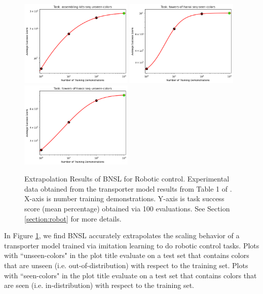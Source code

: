 \documentclass{article} %
\begin{document}
\begin{figure}[htbp]
    \centering
\includegraphics[width=0.48\textwidth]{figures/robot/assembling-kits-seq_unseen-colors.png}
\includegraphics[width=0.48\textwidth]{figures/robot/towers-of-hanoi_seq-seen-colors.png}
\includegraphics[width=0.48\textwidth]{figures/robot/towers-of-hanoi_seq-unseen-colors.png}
    \caption{
Extrapolation Results of BNSL for Robotic control. Experimental data obtained from the transporter \citep{zeng2021transporter} model results from Table 1 of \cite{shridhar2021cliport}. X-axis is number training demonstrations. Y-axis is task success score (mean percentage) obtained via 100 evaluations. See Section \ref{section:robot} for more details.
    }
    \label{fig:robot}
\end{figure}

In Figure \ref{fig:robot}, we find BNSL accurately extrapolates the scaling behavior of a transporter \citep{zeng2021transporter} model trained via imitation learning to do robotic control tasks. Plots with ``unseen-colors" in the plot title evaluate on a test set that contains colors that are unseen (i.e. out-of-distribution) with respect to the training set. Plots with ``seen-colors" in the plot title evaluate on a test set that contains colors that are seen (i.e. in-distribution) with respect to the training set.
\end{document}
